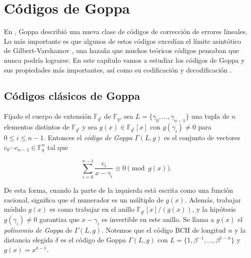 
\chapter{Códigos de Goppa}

En \cite{Goppa_codes_1973}, Goppa describió una nueva clase de códigos de corrección de errores lineales. Lo más importante es que algunos de estos códigos excedían el límite asintótico de Gilbert-Varshamov \cite{Varshamov-Gilbert_bound_1982}, una hazaña que muchos teóricos códigos pensaban que nunca podría lograrse. En este capítulo vamos a estudiar los códigos de Goppa \cite[Sección 13.2.2]{Huffman_Pless_2010} y sus propiedades más importantes, así como su codificación y decodificación \cite{Goppa_codes_1973}.

\section{Códigos clásicos de Goppa}

Fijado el cuerpo de extensión $\mathbb{F}_{q^t}$ de $\mathbb{F}_q$, sea $L = \{ \gamma_0, ..., \gamma_{n-1} \}$ una tupla de $n$ elementos distintos de $\mathbb{F}_{q^t}$ y sea $g(x) \in \mathbb{F}_{q^t}[x]$ con $g(\gamma_i) \neq 0$ para $0 \leq i \leq n - 1$. Entonces el \emph{código de Goppa} $\Gamma(L,g)$ es el conjunto de vectores $c_0 \cdots c_{n-1} \in \mathbb{F}_q^n$ tal que 

\begin{equation}
    \label{def:goppa}
    \sum_{i=0}^{n-1} \frac{c_i}{x - \gamma_i} \equiv 0 \pmod{g(x)}.
\end{equation}

De esta forma, cuando la parte de la izquierda está escrita como una función racional, significa que el numerador es un múltiplo de $g(x)$. Además, trabajar módulo $g(x)$ es como trabajar en el anillo $\mathbb{F}_{q^t}[x]/(g(x))$, y la hipótesis $g(\gamma_i) \neq 0$ garantiza que $x - \gamma_i$ es invertible en este anillo. Se llama a $g(x)$ el \emph{polinomio de Goppa} de $\Gamma(L,g)$. Notemos que el código BCH de longitud $n$ y la distancia elegida $\delta$ es el código de Goppa $\Gamma(L,g)$ con $L = \{ 1, \beta^{-1}, ..., \beta^{1-n} \}$ y $g(x) = x^{\delta - 1}$.


